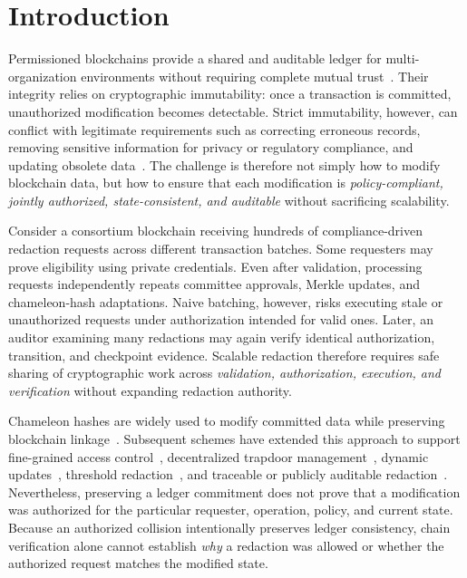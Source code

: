 \documentclass[lettersize,journal]{IEEEtran}
\begin{document}
\section{Introduction}

Permissioned blockchains provide a shared and auditable ledger for
multi-organization environments without requiring complete mutual
trust~\cite{ref7}. Their integrity relies on cryptographic immutability:
once a transaction is committed, unauthorized modification becomes
detectable. Strict immutability, however, can conflict with legitimate
requirements such as correcting erroneous records, removing sensitive
information for privacy or regulatory compliance, and updating obsolete
data~\cite{ref9,ref21,ref22,ref38}. The challenge is therefore not
simply how to modify blockchain data, but how to ensure that each
modification is \emph{policy-compliant, jointly authorized,
state-consistent, and auditable} without sacrificing scalability.

Consider a consortium blockchain receiving hundreds of compliance-driven
redaction requests across different transaction batches. Some requesters
may prove eligibility using private credentials. Even after validation,
processing requests independently repeats committee approvals, Merkle
updates, and chameleon-hash adaptations. Naive batching, however, risks
executing stale or unauthorized requests under authorization intended
for valid ones. Later, an auditor examining many redactions may again
verify identical authorization, transition, and checkpoint evidence.
Scalable redaction therefore requires safe sharing of cryptographic work
across \emph{validation, authorization, execution, and verification}
without expanding redaction authority.

Chameleon hashes are widely used to modify committed data while
preserving blockchain linkage~\cite{ref1,ref2,ref6}. Subsequent schemes
have extended this approach to support fine-grained access
control~\cite{ref8,ref15}, decentralized trapdoor
management~\cite{ref3,ref19}, dynamic updates~\cite{ref5,ref16},
threshold redaction~\cite{ref27}, and traceable or publicly auditable
redaction~\cite{ref33,ref34,ref35}. Nevertheless, preserving a ledger
commitment does not prove that a modification was authorized for the
particular requester, operation, policy, and current state. Because an
authorized collision intentionally preserves ledger consistency, chain
verification alone cannot establish \emph{why} a redaction was allowed
or whether the authorized request matches the modified state.
\end{document}
